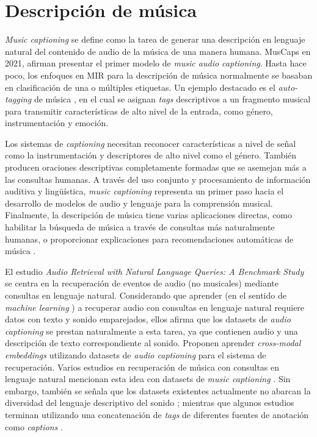 \section{Descripción de música}
\label{sec:music_captioning}

\textit{Music captioning} se define como la tarea de generar una descripción en lenguaje natural del contenido de audio de la música de una manera humana.
MusCaps \cite{Manco2021MusCapsGC} en 2021, afirman presentar el primer modelo de \textit{music audio captioning}. Hasta hace poco, los enfoques en MIR para la descripción de música normalmente se basaban en clasificación de una o múltiples etiquetas. Un ejemplo destacado es el \textit{auto-tagging} de música \cite{Choi2016AutomaticTU, Lee2017SamplelevelDC, Pons2017EndtoendLF}, en el cual se asignan \textit{tags} descriptivos a un fragmento musical para transmitir características de alto nivel de la entrada, como género, instrumentación y emoción.

Los sistemas de \textit{captioning} necesitan reconocer características a nivel de señal como la instrumentación y descriptores de alto nivel como el género. También producen oraciones descriptivas completamente formadas que se asemejan más a las consultas humanas. A través del uso conjunto y procesamiento de información auditiva y lingüística, \textit{music captioning} representa un primer paso hacia el desarrollo de modelos de audio y lenguaje para la comprensión musical. Finalmente, la descripción de música tiene varias aplicaciones directas, como habilitar la búsqueda de música a través de consultas más naturalmente humanas, o proporcionar explicaciones para recomendaciones automáticas de música \cite{Manco2021MusCapsGC}.

El estudio \textit{Audio Retrieval with Natural Language Queries: A Benchmark Study} \cite{Koepke2021AudioRW} se centra en la recuperación de eventos de audio (no musicales) mediante consultas en lenguaje natural. Considerando que aprender (en el sentido de  \textit{machine learning} ) a recuperar audio con consultas en lenguaje natural requiere datos con texto y sonido emparejados, ellos \cite{Koepke2021AudioRW} afirma que los datasets de \textit{audio captioning} se prestan naturalmente a esta tarea, ya que contienen audio y una descripción de texto correspondiente al sonido. Proponen aprender \textit{cross-modal embeddings} utilizando datasets de \textit{audio captioning} para el sistema de recuperación. Varios estudios en recuperación de música con consultas en lenguaje natural mencionan esta idea con datasets de \textit{music captioning} \cite{Doh2022TowardUT, Manco2022ContrastiveAL, Huang2022MuLanAJ}. Sin embargo, también se señala que los datasets existentes actualmente no abarcan la diversidad del lenguaje descriptivo del sonido \cite{Huang2022MuLanAJ}; mientras que algunos estudios terminan utilizando una concatenación de \textit{tags} de diferentes fuentes de anotación como \textit{captions} \cite{Doh2022TowardUT}.

